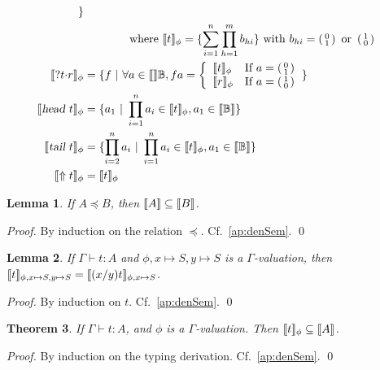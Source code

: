 \documentclass[preprint]{elsarticle}
\newtheorem{theorem}{Theorem}[section]
\newtheorem{lemma}[theorem]{Lemma}
\newcommand\B{\ensuremath{\mathbb B}}
\newcommand\ite[3]{{#1}?{#2}\mathord{\cdot}{#3}}
\newcommand\head{\text{\sl head}}
\newcommand\tail{\text{\sl tail}}
\newcommand\vect[2]{\left(\begin{smallmatrix} #1 \\ #2\end{smallmatrix}\right)}
\begin{document}
\begin{align*}
                       \}\\
               &\qquad\qquad\textrm{where }\den{t}_\phi = \{\sum\limits_{i=1}^n\prod_{h=1}^m b_{hi}\}
                 \textrm{ with }b_{hi}=\vect 01\textrm{ or }\vect 10
  \\
  \den{\ite{}{t}{r}}_\phi &=\{f~|~\forall a\in\den\B, fa=\left\{\begin{array}{ll}
                                                                  \den t_\phi & \textrm{If }a=\vect 01\\
                                                                  \den r_\phi & \textrm{If }a=\vect 10
                                                                \end{array}\right.\}\\
  \den{\head\ t}_\phi &=\{a_1~|~\prod_{i=1}^n a_i\in\den t_\phi, a_1\in\den{\B}\}\\
  \den{\tail\ t}_\phi &=\{\prod_{i=2}^na_i~|~\prod_{i=1}^na_i\in\den t_\phi,a_1\in\den{\B}\}\\
  \den{\Uparrow t}_\phi &= \den t_\phi
\end{align*}

\begin{lemma}
  \label{lem:inc}
  If $A\preceq B$, then $\llbracket A \rrbracket\subseteq\llbracket B \rrbracket$.
\end{lemma}
\begin{proof}
  By induction on the relation $\preceq$. Cf.~\ref{ap:denSem}. \qed
\end{proof}

\begin{lemma}
  \label{lem:subsDen}
  If $\Gamma\vdash t:A$ and $\phi,x\mapsto S,y\mapsto S$ is a
  $\Gamma$-valuation, then $\llbracket t \rrbracket_{\phi,x\mapsto S,y\mapsto
    S}=\llbracket (x/y)t \rrbracket_{\phi,x\mapsto S}$.
\end{lemma}
\begin{proof}
  By induction on $t$. Cf.~\ref{ap:denSem}. \qed
\end{proof}

\begin{theorem}\label{thm:soundness}
  If $\Gamma\vdash t:A$, and $\phi$ is a $\Gamma$-valuation. Then $\llbracket t \rrbracket_\phi\subseteq\llbracket A \rrbracket$.
\end{theorem}
\begin{proof}
  By induction on the typing derivation. Cf.~\ref{ap:denSem}. \qed
\end{proof}
\end{document}
